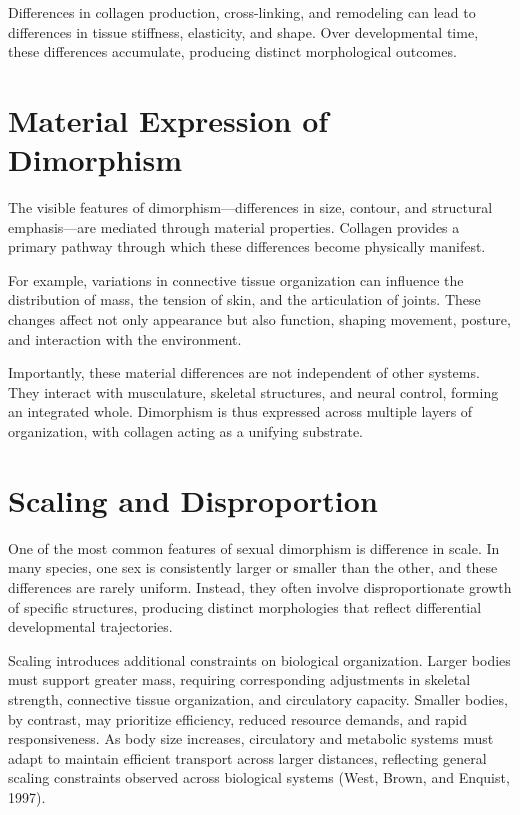 \documentclass[11pt,oneside]{book}
\begin{document}
Differences in collagen production, cross-linking, and remodeling can lead to differences in tissue stiffness, elasticity, and shape. Over developmental time, these differences accumulate, producing distinct morphological outcomes.

\section{Material Expression of Dimorphism}

The visible features of dimorphism—differences in size, contour, and structural emphasis—are mediated through material properties. Collagen provides a primary pathway through which these differences become physically manifest.

For example, variations in connective tissue organization can influence the distribution of mass, the tension of skin, and the articulation of joints. These changes affect not only appearance but also function, shaping movement, posture, and interaction with the environment.

Importantly, these material differences are not independent of other systems. They interact with musculature, skeletal structures, and neural control, forming an integrated whole. Dimorphism is thus expressed across multiple layers of organization, with collagen acting as a unifying substrate.

\section{Scaling and Disproportion}

One of the most common features of sexual dimorphism is difference in scale. In many species, one sex is consistently larger or smaller than the other, and these differences are rarely uniform. Instead, they often involve disproportionate growth of specific structures, producing distinct morphologies that reflect differential developmental trajectories.

Scaling introduces additional constraints on biological organization. Larger bodies must support greater mass, requiring corresponding adjustments in skeletal strength, connective tissue organization, and circulatory capacity. Smaller bodies, by contrast, may prioritize efficiency, reduced resource demands, and rapid responsiveness. As body size increases, circulatory and metabolic systems must adapt to maintain efficient transport across larger distances, reflecting general scaling constraints observed across biological systems (West, Brown, and Enquist, 1997).
\end{document}
